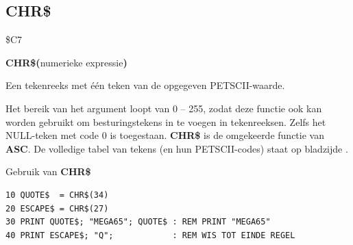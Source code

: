 
\newpage
{}
\subsection{CHR\$}
\label{BASIC 65 Functions!CHR}
\begin{description}[leftmargin=2cm,style=nextline]
\item [Token:]   \$C7

\item [Formaat:]  {\bf CHR\$(}numerieke expressie{\bf)}

\item [Retourneert:] Een tekenreeks met één teken van de opgegeven PETSCII-waarde.

\item [Opmerkingen:] Het bereik van het argument loopt van 0 -- 255, zodat deze functie ook kan worden gebruikt om besturingstekens in te voegen in tekenreeksen. Zelfs het NULL-teken met code 0 is toegestaan. {\bf CHR\$} is de omgekeerde functie van {\bf ASC}. De volledige tabel van tekens (en hun PETSCII-codes) staat op bladzijde \pageref{appendix:petsciicodes}.

\item [Voorbeeld:] Gebruik van {\bf CHR\$}

\begin{tcolorbox}[colback=black,coltext=white]
\verbatimfont{\codefont}
\begin{verbatim}
10 QUOTE$  = CHR$(34)
20 ESCAPE$ = CHR$(27)
30 PRINT QUOTE$; "MEGA65"; QUOTE$ : REM PRINT "MEGA65"
40 PRINT ESCAPE$; "Q";            : REM WIS TOT EINDE REGEL
\end{verbatim}
\end{tcolorbox}
\end{description}


\newpage
